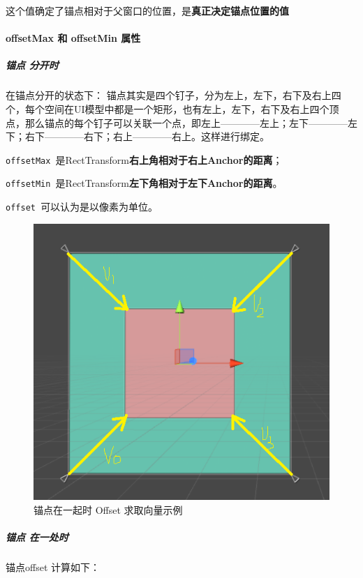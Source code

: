 \documentclass[UTF8,a4paper,12pt]{ctexbook}
\begin{document}
				这个值确定了锚点相对于父窗口的位置，是\textbf{真正决定锚点位置的值}
				
			\paragraph{offsetMax 和 offsetMin 属性}
				\subparagraph{锚点 分开时}
					在锚点分开的状态下： 锚点其实是四个钉子，分为左上，左下，右下及右上四个，每个空间在UI模型中都是一个矩形，也有左上，左下，右下及右上四个顶点，那么锚点的每个钉子可以关联一个点，即左上————左上；左下————左下；右下————右下；右上————右上。这样进行绑定。
					
					\verb|offsetMax |是RectTransform\textbf{右上角相对于右上Anchor的距离}；
			
					\verb|offsetMin |是RectTransform\textbf{左下角相对于左下Anchor的距离}。
			
					\verb|offset |可以认为是以像素为单位。
					
					\begin{figure}[H]
						\centering
						\includegraphics[scale=0.7]{Anchors-1.png}
						\caption{锚点在一起时  Offset 求取向量示例}
						\label{锚点分开时 Offset 求取向量示例}
					\end{figure}
			
				\subparagraph{锚点 在一处时}
					锚点offset 计算如下：
					
\end{document}
